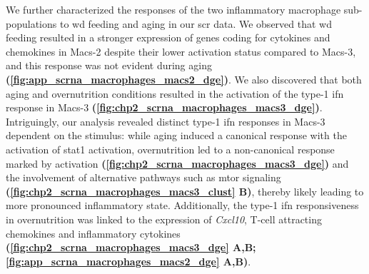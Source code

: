 \par We further characterized the responses of the two inflammatory macrophage sub-populations to \gls{wd} feeding and aging in our \gls{scr} data. We observed that \gls{wd} feeding resulted in a stronger expression of genes coding for cytokines and chemokines in Macs-2 despite their lower activation status compared to Macs-3, and this response was not evident during aging \textbf{(\autoref{fig:app_scrna_macrophages_macs2_dge})}. We also discovered that both aging and overnutrition conditions resulted in the activation of the type-1 \gls{ifn} response in Macs-3 \textbf{(\autoref{fig:chp2_scrna_macrophages_macs3_dge})}. Intriguingly, our analysis revealed distinct type-1 \gls{ifn} responses in Macs-3 dependent on the stimulus: while aging induced a canonical response with the activation of  \gls{stat1} activation, overnutrition led to a non-canonical response marked by  activation \textbf{(\autoref{fig:chp2_scrna_macrophages_macs3_dge})} and the involvement of alternative pathways such as \gls{mtor} signaling \textbf{(\autoref{fig:chp2_scrna_macrophages_macs3_clust} B)}, thereby likely leading to more pronounced inflammatory state. Additionally, the type-1 \gls{ifn} responsiveness in overnutrition was linked to the expression of \textit{Cxcl10}, T-cell attracting chemokines and inflammatory cytokines \textbf{(\autoref{fig:chp2_scrna_macrophages_macs3_dge} A,B; \autoref{fig:app_scrna_macrophages_macs2_dge} A,B)}.

